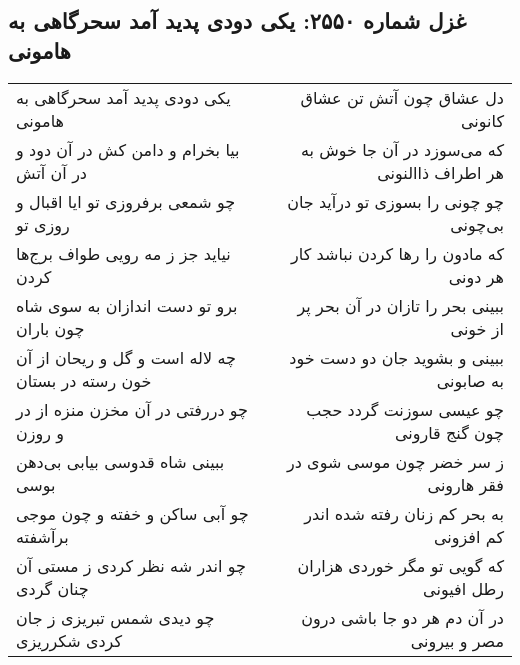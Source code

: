 \begin{center}
\section*{غزل شماره ۲۵۵۰: یکی دودی پدید آمد سحرگاهی به هامونی}
\label{sec:2550}
\begin{longtable}{l p{0.5cm} r}
یکی دودی پدید آمد سحرگاهی به هامونی
&&
دل عشاق چون آتش تن عشاق کانونی
\\
بیا بخرام و دامن کش در آن دود و در آن آتش
&&
که می‌سوزد در آن جا خوش به هر اطراف ذاالنونی
\\
چو شمعی برفروزی تو ایا اقبال و روزی تو
&&
چو چونی را بسوزی تو درآید جان بی‌چونی
\\
نیاید جز ز مه رویی طواف برج‌ها کردن
&&
که مادون را رها کردن نباشد کار هر دونی
\\
برو تو دست اندازان به سوی شاه چون باران
&&
ببینی بحر را تازان در آن بحر پر از خونی
\\
چه لاله است و گل و ریحان از آن خون رسته در بستان
&&
ببینی و بشوید جان دو دست خود به صابونی
\\
چو دررفتی در آن مخزن منزه از در و روزن
&&
چو عیسی سوزنت گردد حجب چون گنج قارونی
\\
ببینی شاه قدوسی بیابی بی‌دهن بوسی
&&
ز سر خضر چون موسی شوی در فقر هارونی
\\
چو آبی ساکن و خفته و چون موجی برآشفته
&&
به بحر کم زنان رفته شده اندر کم افزونی
\\
چو اندر شه نظر کردی ز مستی آن چنان گردی
&&
که گویی تو مگر خوردی هزاران رطل افیونی
\\
چو دیدی شمس تبریزی ز جان کردی شکرریزی
&&
در آن دم هر دو جا باشی درون مصر و بیرونی
\\
\end{longtable}
\end{center}
